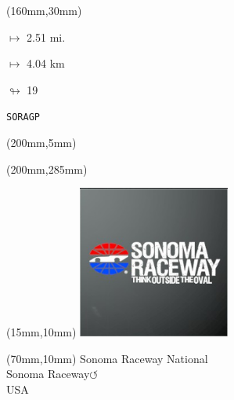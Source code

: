 \begin{textblock*}{40mm}(160mm,30mm)%
\Large
\par$\mapsto$ 2.51 mi.
\par$\mapsto$ 4.04 km
\par$\looparrowright$ 19
\par\hfill\tiny\tt SORAGP\\
\end{textblock*}
\begin{textblock*}{20mm}(200mm,5mm)%
\fbox{\thepage}
\label{SORAGP}
\end{textblock*}
\begin{textblock*}{20mm}(200mm,285mm)%
\fbox{\thepage}
\end{textblock*}

\null\newpage
\begin{textblock*}{50mm}(15mm,10mm)%
\includegraphics[width=50mm]{LG/2015-05-20_00096.png}
\end{textblock*}
\begin{textblock*}{130mm}(70mm,10mm)%
{\fontsize{20}{20}\selectfont Sonoma Raceway National\\}
{\fontsize{16}{16}\selectfont Sonoma Raceway\hfill \huge$\circlearrowleft$\\}
{\fontsize{12}{12}\selectfont USA\\}
\end{textblock*}
